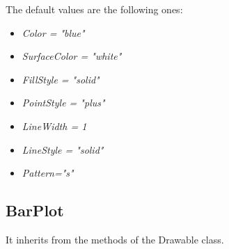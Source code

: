 The default values are the following ones:
\begin{itemize}
\item \textit{Color = "blue"}
\item \textit{SurfaceColor = "white"}
\item \textit{FillStyle = "solid"}
\item \textit{PointStyle = "plus"}
\item \textit{LineWidth = 1}
\item \textit{LineStyle = "solid"}
\item \textit{Pattern="s"}
\end{itemize}



\newpage
\subsection{BarPlot}


It inherits from the methods of the Drawable class.

